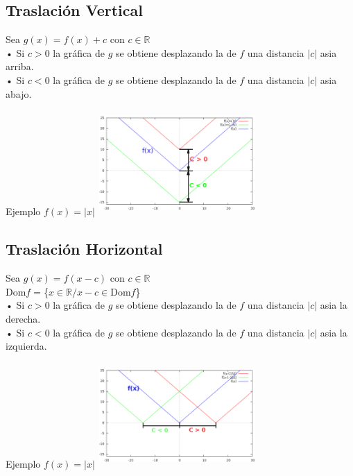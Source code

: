 \subsection{Traslación Vertical}
\hfill
\begin{minipage}{.45\textwidth}
Sea $g(x)= f(x)+c$ con $c \in \mathbb{R}$\\

• Si $c>0$ la gráfica de $g$ se obtiene desplazando la de $f$ una distancia $|c|$ asia arriba.\\

• Si $c<0$ la gráfica de $g$ se obtiene desplazando la de $f$ una distancia $|c|$ asia abajo. 
\end{minipage}
\hfill
\begin{minipage}{.45\textwidth}
\begin{center}
Ejemplo $f(x)=|x|$
\includegraphics[height=4cm,width=6cm]{transV.eps} 
\end{center} 
\end{minipage}
\hfill

\subsection{Traslación Horizontal}
\hfill
\begin{minipage}{.45\textwidth}
Sea $g(x)= f(x-c)$ con $c \in \mathbb{R}$\\
Dom$f=$\{$x \in \mathbb{R} /x-c \in $Dom$f$\}\\

• Si $c>0$ la gráfica de $g$ se obtiene desplazando la de $f$ una distancia $|c|$ asia la derecha.\\

• Si $c<0$ la gráfica de $g$ se obtiene desplazando la de $f$ una distancia $|c|$ asia la izquierda. 
\end{minipage}
\hfill
\begin{minipage}{.45\textwidth}
\begin{center}
Ejemplo $f(x)=|x|$
\includegraphics[height=4cm,width=6cm]{transH.eps} 
\end{center} 
\end{minipage}
\hfill
\newpage

